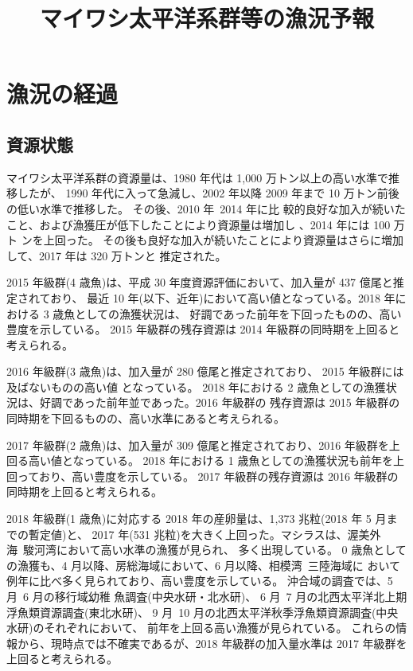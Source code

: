 \documentclass[11pt]{article}
\author{}
\date{}
\title{マイワシ太平洋系群等の漁況予報}
\begin{document}
\maketitle

\section{漁況の経過}
\subsection{資源状態}
マイワシ太平洋系群の資源量は、1980 年代は 1,000 万トン以上の高い水準で推移したが、
1990 年代に入って急減し、2002 年以降 2009 年まで 10 万トン前後の低い水準で推移した。
その後、2010 年~2014 年に比 較的良好な加入が続いたこと、および漁獲圧が低下したことにより資源量は増加し
、2014 年には 100 万ト ンを上回った。
その後も良好な加入が続いたことにより資源量はさらに増加して、2017 年は 320 万トンと 推定された。

2015 年級群(4 歳魚)は、平成 30 年度資源評価において、加入量が 437 億尾と推定されており、
最近 10 年(以下、近年)において高い値となっている。2018 年における 3 歳魚としての漁獲状況は、
好調であった前年を下回ったものの、高い豊度を示している。
2015 年級群の残存資源は 2014 年級群の同時期を上回ると考えられる。

2016 年級群(3 歳魚)は、加入量が 280 億尾と推定されており、
2015 年級群には及ばないものの高い値 となっている。
2018 年における 2 歳魚としての漁獲状況は、好調であった前年並であった。2016 年級群の
残存資源は 2015 年級群の同時期を下回るものの、高い水準にあると考えられる。

2017 年級群(2 歳魚)は、加入量が 309 億尾と推定されており、2016 年級群を上回る高い値となっている。
2018 年における 1 歳魚としての漁獲状況も前年を上回っており、高い豊度を示している。
2017 年級群の残存資源は 2016 年級群の同時期を上回ると考えられる。

2018 年級群(1 歳魚)に対応する 2018 年の産卵量は、1,373 兆粒(2018 年 5 月までの暫定値)と、
2017 年(531 兆粒)を大きく上回った。マシラスは、渥美外海~駿河湾において高い水準の漁獲が見られ、 多く出現している。
0 歳魚としての漁獲も、4 月以降、房総海域において、6 月以降、相模湾~三陸海域に おいて例年に比べ多く見られており、高い豊度を示している。
沖合域の調査では、5 月~6 月の移行域幼稚 魚調査(中央水研・北水研)、
6 月~7 月の北西太平洋北上期浮魚類資源調査(東北水研)、
9 月~10 月の北西太平洋秋季浮魚類資源調査(中央水研)のそれぞれにおいて、
前年を上回る高い漁獲が見られている。
これらの情報から、現時点では不確実であるが、2018 年級群の加入量水準は 2017 年級群を上回ると考えられる。
\end{document}
